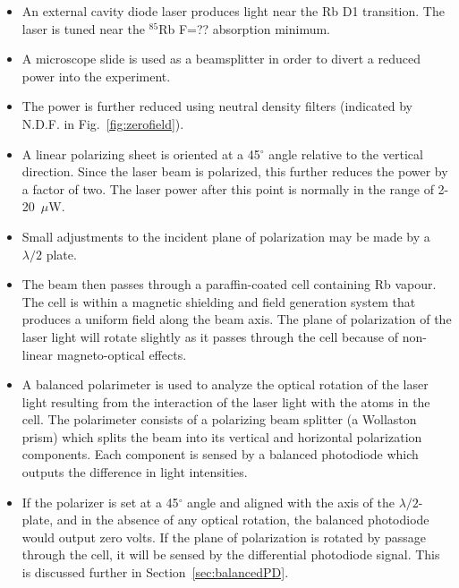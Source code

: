 \begin{itemize}
\item An external cavity diode laser produces light near the Rb D1
  transition.  The laser is tuned near the $^{85}$Rb F=?? absorption
  minimum.
\item A microscope slide is used as a beamsplitter in order to divert
  a reduced power into the experiment.
\item The power is further reduced using neutral density filters
  (indicated by N.D.F. in Fig.~\ref{fig:zerofield}).
\item A linear polarizing sheet is oriented at a 45$^\circ$ angle
  relative to the vertical direction.  Since the laser beam is
  polarized, this further reduces the power by a factor of two.  The
  laser power after this point is normally in the range of
 2-20~$\mu$W.
\item Small adjustments to the incident plane of polarization may be
  made by a $\lambda/2$ plate.
\item The beam then passes through a paraffin-coated cell containing
  Rb vapour.  The cell is within a magnetic shielding and field
  generation system that produces a uniform field along the beam axis.
  The plane of polarization of the laser light will rotate slightly as
  it passes through the cell because of non-linear magneto-optical
  effects.
\item A balanced polarimeter is used to analyze the optical rotation
  of the laser light resulting from the interaction of the laser light
  with the atoms in the cell.  The polarimeter consists of a
  polarizing beam splitter (a Wollaston prism) which splits the beam
  into its vertical and horizontal polarization components.  Each
  component is sensed by a balanced photodiode which outputs the
  difference in light intensities.
\item If the polarizer is set at a 45$^\circ$ angle and aligned with
  the axis of the $\lambda/2$-plate, and in the absence of any optical
  rotation, the balanced photodiode would output zero volts.  If the
  plane of polarization is rotated by passage through the cell, it
  will be sensed by the differential photodiode signal.  This is
  discussed further in Section~\ref{sec:balancedPD}.
\end{itemize}

